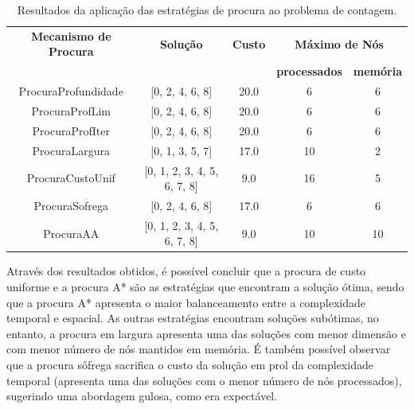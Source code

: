 \begin{table}[htbp]
    \centering
    \caption{Resultados da aplicação das estratégias de procura ao problema de contagem.}
    \label{tab:resultados-procura-contagem}
    \vspace{0.2cm}
    \begin{tabular}{|c|c|c|c|c|}
        \hline
        \textbf{Mecanismo de Procura} & \textbf{Solução} & \textbf{Custo} & \multicolumn{2}{c|}{\textbf{Máximo de Nós}} \\ \cline{4-5}
        &                             &      & \textbf{processados} & \textbf{memória} \\

        \hline
        ProcuraProfundidade & [0, 2, 4, 6, 8]             & 20.0 & 6                    & 6                \\
        \hline
        ProcuraProfLim      & [0, 2, 4, 6, 8]             & 20.0 & 6                    & 6                \\
        \hline
        ProcuraProfIter     & [0, 2, 4, 6, 8]             & 20.0 & 6                    & 6                \\
        \hline
        ProcuraLargura      & [0, 1, 3, 5, 7]             & 17.0 & 10                   & 2                \\
        \hline
        ProcuraCustoUnif    & [0, 1, 2, 3, 4, 5, 6, 7, 8] & 9.0  & 16                   & 5                \\
        \hline
        ProcuraSofrega      & [0, 2, 4, 6, 8]             & 17.0 & 6                    & 6                \\
        \hline
        ProcuraAA           & [0, 1, 2, 3, 4, 5, 6, 7, 8] & 9.0  & 10                   & 10               \\
        \hline
    \end{tabular}
\end{table}


Através dos resultados obtidos, é possível concluir que a procura de custo uniforme e a procura A* são as estratégias que encontram a solução ótima, sendo que a procura A* apresenta o maior balanceamento entre a complexidade temporal e espacial.
As outras estratégias encontram soluções subótimas, no entanto, a procura em largura apresenta uma das soluções com menor dimensão e com menor número de nós mantidos em memória.
É também possível observar que a procura sôfrega sacrifica o custo da solução em prol da complexidade temporal (apresenta uma das soluções com o menor número de nós processados), sugerindo uma abordagem gulosa, como era expectável.

